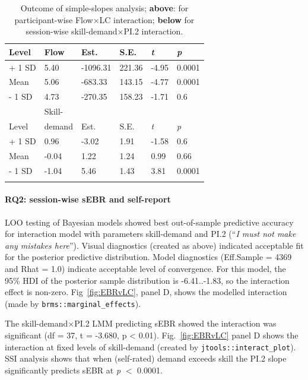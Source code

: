 \documentclass[10pt,letterpaper,floatsintext]{article}
\begin{document}
\begin{table}[!hb]
\centering
\caption{Outcome of simple-slopes analysis; \textbf{above}: for participant-wise Flow$\times$LC interaction; \textbf{below} for session-wise skill-demand$\times$PI.2 interaction.}
\begin{tabular}{llllll}
\hline
Level  & Flow & Est.     & S.E.   & \textit{t} & \textit{p} \\
\hline
+ 1 SD & 5.40 & -1096.31 & 221.36 & -4.95 & 0.0001 \\
Mean   & 5.06 &  -683.33 & 143.15 & -4.77 & 0.0001 \\
- 1 SD & 4.73 &  -270.35 & 158.23 & -1.71 & 0.6 \\
\hline
       & Skill- &      &      &            & \\
Level  & demand & Est. & S.E. & \textit{t} & \textit{p} \\
\hline
+ 1 SD & 0.96 &    -3.02 &   1.91 & -1.58 & 0.6 \\
Mean   &-0.04 &     1.22 &   1.24 &  0.99 & 0.66 \\
- 1 SD &-1.04 &     5.46 &   1.43 &  3.81 & 0.0001 \\
\hline
\label{tab:simpslopes}
\end{tabular}
\end{table}

\paragraph{RQ2: session-wise sEBR and self-report}
LOO testing of Bayesian models showed best out-of-sample predictive accuracy for interaction model with parameters skill-demand and PI.2 (``\textit{I must not make any mistakes here}''). 
Visual diagnostics (created as above) indicated acceptable fit for the posterior predictive distribution. Model diagnostics (Eff.Sample = 4369 and Rhat = 1.0) indicate acceptable level of convergence. For this model, the 95\% HDI of the posterior sample distribution is -6.41..-1.83, so the interaction effect is non-zero. Fig~\ref{fig:EBRvLC}, panel D, shows the modelled interaction (made by \verb|brms::marginal_effects|).

The skill-demand$\times$PI.2 LMM predicting sEBR showed the interaction was significant (df = 37, t = -3.680, p < 0.01). %
Fig.~\ref{fig:EBRvLC} panel D shows the interaction at fixed levels of skill-demand (created by \verb|jtools::interact_plot|). SSI analysis shows that when (self-rated) demand exceeds skill the PI.2 slope significantly predicts sEBR at {\it p} $<$ 0.0001. %
\end{document}
